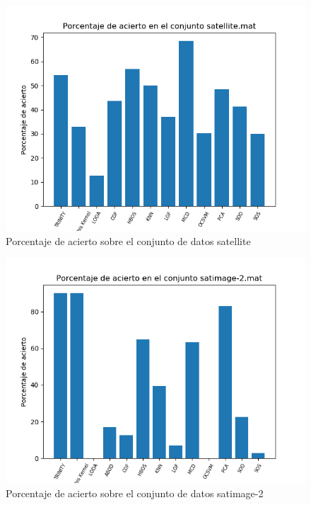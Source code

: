 \begin{figure}[H]
	\centering
	\includegraphics[scale=0.7]{imagenes/imgs-exp1/accuracy/satellite}
	\caption{Porcentaje de acierto sobre el conjunto de datos satellite}
	\label{satellite_accuracy}
\end{figure}

\begin{figure}[H]
	\centering
	\includegraphics[scale=0.7]{imagenes/imgs-exp1/accuracy/satimage-2}
	\caption{Porcentaje de acierto sobre el conjunto de datos satimage-2}
	\label{satimage-2_accuracy}
\end{figure}

